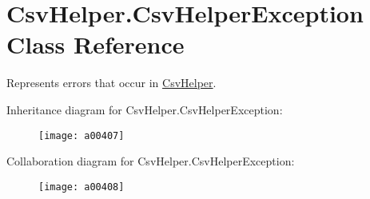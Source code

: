 \hypertarget{a00056}{\section{Csv\-Helper.\-Csv\-Helper\-Exception Class Reference}
\label{a00056}
}


Represents errors that occur in \hyperlink{a00319}{Csv\-Helper}.  




Inheritance diagram for Csv\-Helper.\-Csv\-Helper\-Exception\-:
\nopagebreak
\begin{figure}[H]
\begin{center}
\leavevmode
\texttt{[image: a00407]}
\end{center}
\end{figure}


Collaboration diagram for Csv\-Helper.\-Csv\-Helper\-Exception\-:
\nopagebreak
\begin{figure}[H]
\begin{center}
\leavevmode
\texttt{[image: a00408]}
\end{center}
\end{figure}
